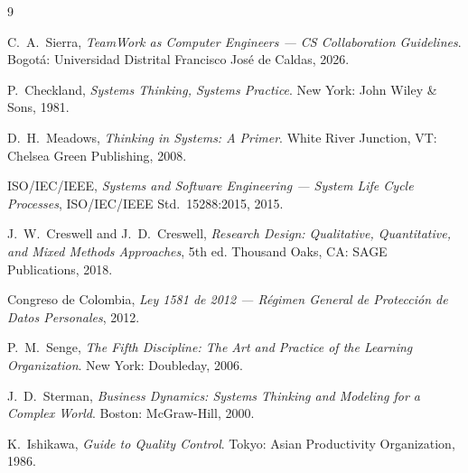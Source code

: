 \documentclass[conference]{IEEEtran}
\begin{document}
\begin{thebibliography}{9}

C.~A.~Sierra, \emph{TeamWork as Computer Engineers --- CS Collaboration Guidelines}.
Bogot\'a: Universidad Distrital Francisco Jos\'e de Caldas, 2026.

P.~Checkland, \emph{Systems Thinking, Systems Practice}.
New York: John Wiley \& Sons, 1981.

D.~H.~Meadows, \emph{Thinking in Systems: A Primer}.
White River Junction, VT: Chelsea Green Publishing, 2008.

ISO/IEC/IEEE, \emph{Systems and Software Engineering --- System Life Cycle Processes},
ISO/IEC/IEEE Std.\ 15288:2015, 2015.

J.~W.~Creswell and J.~D.~Creswell, \emph{Research Design: Qualitative,
Quantitative, and Mixed Methods Approaches}, 5th ed.
Thousand Oaks, CA: SAGE Publications, 2018.

Congreso de Colombia, \emph{Ley 1581 de 2012 --- R\'egimen General de
Protecci\'on de Datos Personales}, 2012.

P.~M.~Senge, \emph{The Fifth Discipline: The Art and Practice of the
Learning Organization}. New York: Doubleday, 2006.

J.~D.~Sterman, \emph{Business Dynamics: Systems Thinking and Modeling
for a Complex World}. Boston: McGraw-Hill, 2000.

K.~Ishikawa, \emph{Guide to Quality Control}.
Tokyo: Asian Productivity Organization, 1986.

\end{thebibliography}
\end{document}
